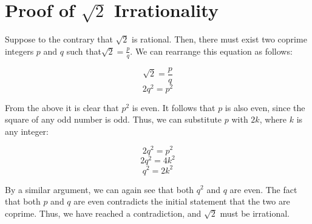 \documentclass{article}
\date{}
\author{Kaan Aksoy | Feb 24, 2020}
\begin{document}
\maketitle
\section{Proof of $\sqrt{2}$ Irrationality}
Suppose to the contrary that $\sqrt{2}$ is rational. 
Then, there must exist two coprime integers $p$ and $q$ 
such that$\sqrt{2} = \frac{p}{q}$. We can rearrange 
this equation as follows:

$$\sqrt{2} = \frac{p}{q}$$
$$2q^2 = p^2$$

From the above it is clear that $p^2$ is even. It follows 
that $p$ is also even, since the square of any odd number 
is odd. Thus, we can substitute $p$ with $2k$, where $k$ 
is any integer:

$$2q^2 = p^2$$
$$2q^2 = 4k^2$$
$$q^2 = 2k^2$$

By a similar argument, we can again see that both $q^2$
and $q$ are even. The fact that both $p$ 
and $q$ are even contradicts the initial statement that 
the two are coprime. Thus, we have reached a contradiction, 
and $\sqrt{2}$ must be irrational.
\end{document}
